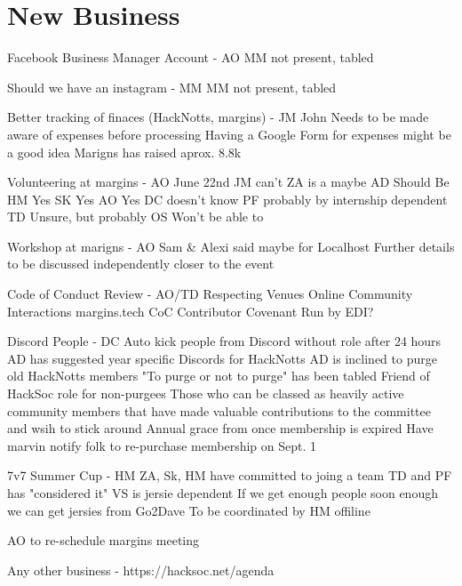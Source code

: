 \documentclass[11pt,hacksoc]{meetingmins}
\begin{document}
\section{New Business}
\begin{items}
  \item Facebook Business Manager Account - AO
    \subitem MM not present, tabled
  \item Should we have an instagram - MM
    \subitem MM not present, tabled
  \item Better tracking of finaces (HackNotts, margins) - JM
    \subitem John Needs to be made aware of expenses before processing
    \subitem Having a Google Form for expenses might be a good idea
    \subitem Marigns has raised aprox. 8.8k
  \item Volunteering at margins - AO
    \subitem June 22nd
    \subitem JM can't
    \subitem ZA is a maybe
    \subitem AD Should Be
    \subitem HM Yes
    \subitem SK Yes
    \subitem AO Yes
    \subitem DC doesn't know
    \subitem PF probably by internship dependent
    \subitem TD Unsure, but probably
    \subitem OS Won't be able to
  \item Workshop at marigns - AO
    \subitem Sam \& Alexi said maybe for Localhost
    \subitem Further details to be discussed independently closer to the event
  \item Code of Conduct Review - AO/TD
    \subitem Respecting Venues
    \subitem Online Community Interactions
    \subitem margins.tech CoC
    \subitem Contributor Covenant
    \subitem Run by EDI?
  \item Discord People - DC
    \subitem  Auto kick people from Discord without role after 24 hours
    \subitem AD has suggested year specific Discords for HackNotts
    \subitem AD is inclined to purge old HackNotts members
    \subitem "To purge or not to purge" has been tabled
    \subitem Friend of HackSoc role for non-purgees
      \subsubitem Those who can be classed as heavily active community members that have made valuable contributions to the committee and wsih to stick around
    \subitem Annual grace from once membership is expired
    \subitem Have marvin notify folk to re-purchase membership on Sept. 1
  \item 7v7 Summer Cup - HM
    \subitem ZA, Sk, HM have committed to joing a team
    \subitem TD and PF has "considered it"
    \subitem VS is jersie dependent
    \subitem If we get enough people soon enough we can get jersies from Go2Dave
    \subitem To be coordinated by HM offiline
  \item AO to re-schedule margins meeting
  \item Any other business - https://hacksoc.net/agenda
\end{items}

\vspace{1em}
\end{document}
